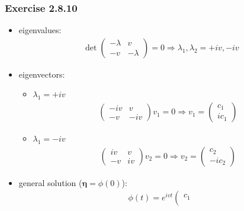 \documentclass[12pt, letterpaper]{scrartcl}
\begin{document}
\subsubsection*{Exercise 2.8.10}
\begin{itemize}
    \item eigenvalues:
    \begin{align*}
        \det 
        \left(\begin{array}{cc}
        -\lambda & v \\
        -v & -\lambda 
        \end{array}\right)=0
        \Longrightarrow
        \lambda_{1},\lambda_{2}=+iv, -iv
    \end{align*}
    \item eigenvectors:
    \begin{itemize}
        \item $\lambda_{1}=+iv$
        \begin{align*}
            \left(\begin{array}{cc}
            -iv & v \\
            -v & -iv 
            \end{array}\right)
            v_1=0
            \Longrightarrow
            v_1=\left(\begin{array}{c}
            c_1 \\
            ic_1 
            \end{array}\right)
        \end{align*}
        \item $\lambda_{1}=-iv$
        \begin{align*}
            \left(\begin{array}{cc}
            iv & v \\
            -v & iv 
            \end{array}\right)
            v_2=0
            \Longrightarrow
            v_2=\left(\begin{array}{c}
            c_2 \\
            -ic_2 
            \end{array}\right)
        \end{align*}
    \end{itemize}
    \item general solution (${\boldsymbol\eta}=\phi(0)$):
    \begin{align*}
        \phi(t)=
        e^{ivt}
        \left(\begin{array}{c}
            c_1 \\

\end{array}
\end{align*}
\end{itemize}
\end{document}
